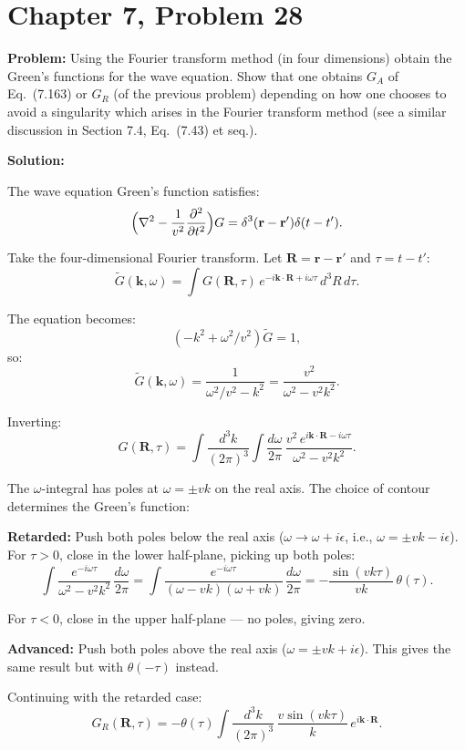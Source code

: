 \documentclass[12pt]{article}
\begin{document}
\section*{Chapter 7, Problem 28}

\textbf{Problem:} Using the Fourier transform method (in four dimensions) obtain the Green's functions for the wave equation. Show that one obtains $G_A$ of Eq.\ (7.163) or $G_R$ (of the previous problem) depending on how one chooses to avoid a singularity which arises in the Fourier transform method (see a similar discussion in Section 7.4, Eq.\ (7.43) et seq.).

\bigskip
\textbf{Solution:}

The wave equation Green's function satisfies:
\[
\Bigl(\nabla^2 - \frac{1}{v^2}\frac{\partial^2}{\partial t^2}\Bigr)G = \delta^3(\mathbf{r}-\mathbf{r}')\delta(t-t').
\]

Take the four-dimensional Fourier transform. Let $\mathbf{R} = \mathbf{r}-\mathbf{r}'$ and $\tau = t-t'$:
\[
\tilde{G}(\mathbf{k},\omega) = \int G(\mathbf{R},\tau)\,e^{-i\mathbf{k}\cdot\mathbf{R}+i\omega\tau}\,d^3R\,d\tau.
\]

The equation becomes:
\[
(-k^2 + \omega^2/v^2)\tilde{G} = 1,
\]
so:
\[
\tilde{G}(\mathbf{k},\omega) = \frac{1}{\omega^2/v^2 - k^2} = \frac{v^2}{\omega^2 - v^2k^2}.
\]

Inverting:
\[
G(\mathbf{R},\tau) = \int\frac{d^3k}{(2\pi)^3}\int\frac{d\omega}{2\pi}\,\frac{v^2\,e^{i\mathbf{k}\cdot\mathbf{R}-i\omega\tau}}{\omega^2 - v^2k^2}.
\]

The $\omega$-integral has poles at $\omega = \pm vk$ on the real axis. The choice of contour determines the Green's function:

\textbf{Retarded:} Push both poles below the real axis ($\omega \to \omega + i\epsilon$, i.e., $\omega = \pm vk - i\epsilon$). For $\tau > 0$, close in the lower half-plane, picking up both poles:
\[
\int\frac{e^{-i\omega\tau}}{\omega^2 - v^2k^2}\,\frac{d\omega}{2\pi} = \int\frac{e^{-i\omega\tau}}{(\omega-vk)(\omega+vk)}\,\frac{d\omega}{2\pi} = -\frac{\sin(vk\tau)}{vk}\,\theta(\tau).
\]

For $\tau < 0$, close in the upper half-plane --- no poles, giving zero.

\textbf{Advanced:} Push both poles above the real axis ($\omega = \pm vk + i\epsilon$). This gives the same result but with $\theta(-\tau)$ instead.

Continuing with the retarded case:
\[
G_R(\mathbf{R},\tau) = -\theta(\tau)\int\frac{d^3k}{(2\pi)^3}\,\frac{v\sin(vk\tau)}{k}\,e^{i\mathbf{k}\cdot\mathbf{R}}.
\]
\end{document}
